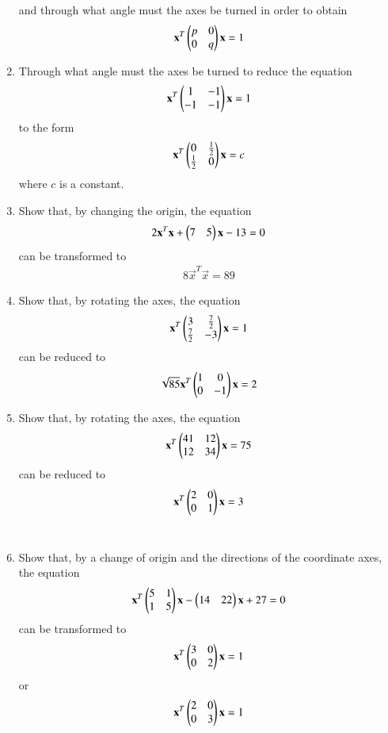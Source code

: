 \begin{enumerate}[label=\arabic*.,ref=\thesubsection.\theenumi]
and through what angle must the axes be turned in order to obtain
\begin{align}
\mathbf{x}^T\begin{pmatrix}p & 0\\0 & q\end{pmatrix}\mathbf{x}= 1
\end{align}
\item Through what angle must the axes be turned to reduce the equation
\begin{align}
\mathbf{x}^T\begin{pmatrix}1 & -1\\-1 & -1\end{pmatrix}\mathbf{x}=1
\end{align}
to the form
\begin{align}
\mathbf{x}^T\begin{pmatrix}0 & \frac{1}{2}\\ \frac{1}{2} & 0\end{pmatrix}\mathbf{x} = c
\end{align}
where $c$ is a constant.
\item Show that, by changing the origin, the equation
\begin{align}
2\mathbf{x}^T\mathbf{x}+\begin{pmatrix}7 & 5\end{pmatrix}\mathbf{x} - 13 = 0
\end{align}
can be transformed to 
\begin{align}
8\vec{x}^T\vec{x} = 89
\end{align}
\item Show that, by rotating the axes, the equation
\begin{align}
\mathbf{x}^T\begin{pmatrix}3 & \frac{7}{2}\\ \frac{7}{2} & -3\end{pmatrix}\mathbf{x}= 1
\end{align}
can be reduced to 
\begin{align}
\sqrt{85}\mathbf{x}^T\begin{pmatrix}1 & 0\\ 0 & -1\end{pmatrix}\mathbf{x}= 2
\end{align}
\item Show that, by rotating the axes, the equation
\begin{align}
\mathbf{x}^T\begin{pmatrix}41 & 12\\ 12 & 34\end{pmatrix}\mathbf{x}= 75
\label{eq:solutions/3/4/9/1}
\end{align}
can be reduced to 
\begin{align}
\mathbf{x}^T\begin{pmatrix}2 & 0\\ 0 & 1\end{pmatrix}\mathbf{x}= 3
\end{align}
\\
\solution

\item Show that, by a change of origin and the directions of the coordinate axes, the equation
\begin{align}
\mathbf{x}^T\begin{pmatrix}5 & 1\\ 1 & 5\end{pmatrix}\mathbf{x}-\begin{pmatrix}14 & 22\end{pmatrix}\mathbf{x}+27= 0
\end{align}
can be transformed to
\begin{align}
\mathbf{x}^T\begin{pmatrix}3 & 0\\ 0 & 2\end{pmatrix}\mathbf{x}= 1
\end{align}
or
\begin{align}
\mathbf{x}^T\begin{pmatrix}2 & 0\\ 0 & 3\end{pmatrix}\mathbf{x}= 1
\end{align}
\end{enumerate}
